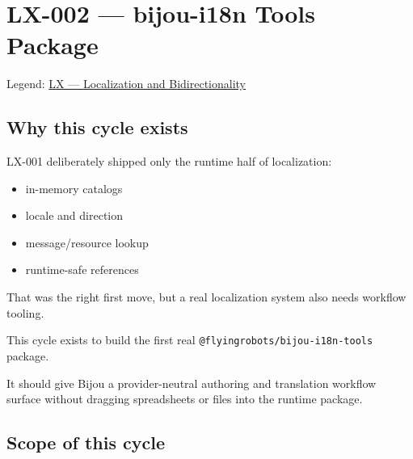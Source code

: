 \chapter{LX-002 --- bijou-i18n Tools Package}\label{record-189}

\smallskip

Legend: \href{https://github.com/flyingrobots/bijou/blob/1853ad902f6bf219326409e7f743a5a1d6517dbc/docs/legends/LX-localization-and-bidirectionality.md}{LX --- Localization and Bidirectionality}

\section{Why this cycle exists}\label{record-189-why-this-cycle-exists}

LX-001 deliberately shipped only the runtime half of localization:

\begin{itemize}
\tightlist
\item
  in-memory catalogs
\item
  locale and direction
\item
  message/resource lookup
\item
  runtime-safe references
\end{itemize}

That was the right first move, but a real localization system also needs workflow tooling.

This cycle exists to build the first real \texttt{@\allowbreak{}f\allowbreak{}l\allowbreak{}y\allowbreak{}i\allowbreak{}n\allowbreak{}g\allowbreak{}r\allowbreak{}o\allowbreak{}b\allowbreak{}o\allowbreak{}t\allowbreak{}s\allowbreak{}/\allowbreak{}b\allowbreak{}i\allowbreak{}j\allowbreak{}o\allowbreak{}u\allowbreak{}-\allowbreak{}i\allowbreak{}1\allowbreak{}8\allowbreak{}n\allowbreak{}-\allowbreak{}t\allowbreak{}o\allowbreak{}o\allowbreak{}l\allowbreak{}s} package.

It should give Bijou a provider-neutral authoring and translation workflow surface without dragging spreadsheets or files into the runtime package.

\section{Scope of this cycle}\label{record-189-scope-of-this-cycle}

